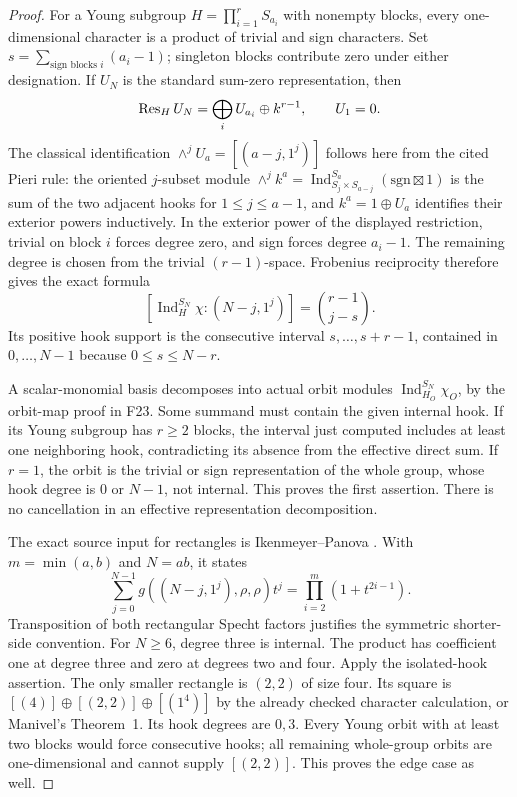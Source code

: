 \documentclass[11pt,a4paper]{article}
\newcommand{\fid}[1]{\textsf{#1}}\newcommand{\gate}[1]{\textsf{#1}}
\theoremstyle{named}\newtheorem{finding}{Finding}[section]
\theoremstyle{definition}\newtheorem{definition}[finding]{Definition}
\theoremstyle{remark}\newtheorem{remark}[finding]{Remark}
\begin{document}
\begin{proof}
For a Young subgroup $H=\prod_{i=1}^r S_{a_i}$ with nonempty blocks,
every one-dimensional character is a product of trivial and sign
characters. Set $s=\sum_{\text{sign blocks }i}(a_i-1)$; singleton
blocks contribute zero under either designation. If $U_N$ is the
standard sum-zero representation, then
\[
 \operatorname{Res}_H U_N=\bigoplus_i U_{a_i}\oplus k^{r-1},\qquad U_1=0.
\]
The classical identification $\wedge^jU_a=[(a-j,1^j)]$ follows here
from the cited Pieri rule: the oriented $j$-subset module
$\wedge^j k^a=\operatorname{Ind}_{S_j\times S_{a-j}}^{S_a}
(\mathrm{sgn}\boxtimes1)$ is the sum of the two adjacent hooks for $1\le j\le a-1$,
and $k^a=1\oplus U_a$ identifies their exterior powers inductively.
In the exterior power of the displayed restriction, trivial on block
$i$ forces degree zero, and sign forces degree $a_i-1$. The remaining
degree is chosen from the trivial $(r-1)$-space. Frobenius reciprocity
therefore gives the exact formula
\[
 [\operatorname{Ind}_H^{S_N}\chi:(N-j,1^j)]
       =\binom{r-1}{j-s}.
\]
Its positive hook support is the consecutive interval
$s,\ldots,s+r-1$, contained in $0,\ldots,N-1$ because
$0\le s\le N-r$.

A scalar-monomial basis decomposes into actual orbit modules
$\operatorname{Ind}_{H_O}^{S_N}\chi_O$, by the orbit-map proof in
\fid{F23}. Some summand must contain the given internal hook. If its
Young subgroup has $r\ge2$ blocks, the interval just computed includes
at least one neighboring hook, contradicting its absence from the
effective direct sum. If $r=1$, the orbit is the trivial or sign
representation of the whole group, whose hook degree is $0$ or
$N-1$, not internal. This proves the first assertion. There is no
cancellation in an effective representation decomposition.

The exact source input for rectangles is Ikenmeyer--Panova
\cite[Proposition~6.4, pp.~15--16]{IP}. With $m=\min(a,b)$ and $N=ab$,
it states
\begin{equation}\label{eq:recthookproduct}
 \sum_{j=0}^{N-1}g((N-j,1^j),\rho,\rho)t^j
       =\prod_{i=2}^{m}(1+t^{2i-1}).
\end{equation}
Transposition of both rectangular Specht factors justifies the
symmetric shorter-side convention. For $N\ge6$, degree three is
internal. The product has coefficient one at degree three and zero
at degrees two and four. Apply the isolated-hook assertion.
The only smaller rectangle is $(2,2)$ of size four. Its square is
$[(4)]\oplus[(2,2)]\oplus[(1^4)]$ by the already checked character
calculation, or Manivel's Theorem~1. Its hook degrees are $0,3$.
Every Young orbit with at least two blocks would force consecutive
hooks; all remaining whole-group orbits are one-dimensional and
cannot supply $[(2,2)]$. This proves the edge case as well.
\end{proof}
\end{document}
